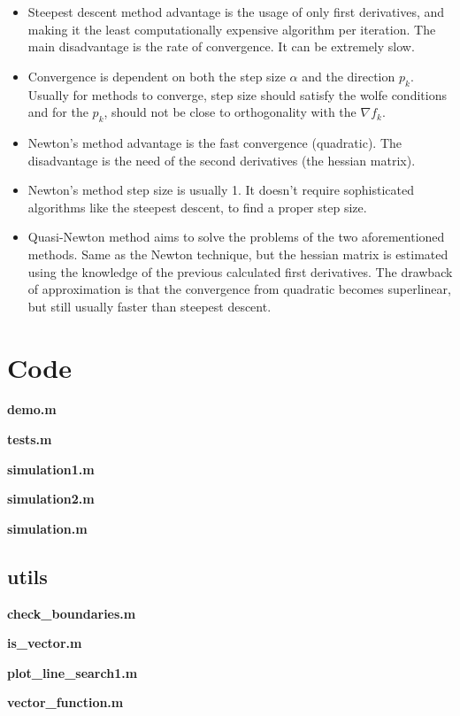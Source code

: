 \documentclass[a4paper,11pt]{article}
\numberwithin{equation}{section} %
\begin{document}
\begin{itemize}
    \item Steepest descent method advantage is the usage of only first derivatives, and making it the least computationally expensive algorithm per iteration. The main disadvantage is the rate of convergence. It can be extremely slow.

    \item Convergence is dependent on both the step size $\alpha$ and the direction $p_k$. Usually for methods to converge, step size should satisfy the wolfe conditions and for the $p_k$, should not be close to orthogonality with the $\nabla f_k$.
    
    \item Newton's method advantage is the fast convergence (quadratic). The disadvantage is the need of the second derivatives (the hessian matrix). 
    
    \item Newton's method step size is usually 1. It doesn't require sophisticated algorithms like the steepest descent, to find a proper step size.
    
    \item Quasi-Newton method aims to solve the problems of the two aforementioned methods. Same as the Newton technique, but the hessian matrix is estimated using the knowledge of the previous calculated first derivatives. The drawback of approximation is that the convergence from quadratic becomes superlinear, but still usually faster than steepest descent.
    
\end{itemize}

\label{code}
\section{Code}

\textbf{demo.m}

% 
\textbf{tests.m}

\textbf{simulation1.m}

\textbf{simulation2.m}

\textbf{simulation.m}



\subsection{utils}
\textbf{check\_boundaries.m}

\textbf{is\_vector.m}

\textbf{plot\_line\_search1.m}

\textbf{vector\_function.m}

\end{document}
